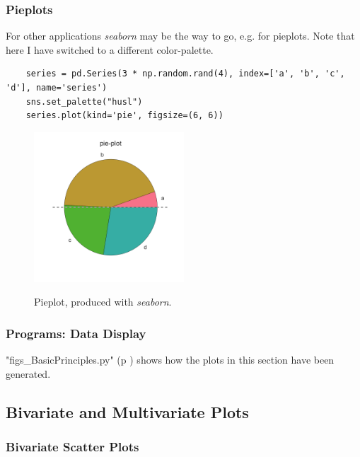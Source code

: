 \subsubsection{Pieplots}

For other applications \emph{seaborn} may be the way to go, e.g. for pieplots. Note that here I have switched to a different color-palette.

\begin{lstlisting}
    series = pd.Series(3 * np.random.rand(4), index=['a', 'b', 'c', 'd'], name='series')
    sns.set_palette("husl")
    series.plot(kind='pie', figsize=(6, 6))
\end{lstlisting}

\begin{figure}[H]
  \centering
  \includegraphics[width=0.5\textwidth]{../Images/pieplot.png}\\
  \caption{Pieplot, produced with \emph{seaborn}.}\label{fig:pieplot}
\end{figure}


\subsubsection{Programs: Data Display}
\PyImg "figs\_BasicPrinciples.py" (p \pageref{py:BasicPrinciples}) shows how the plots in this section have been generated.

\subsection{Bivariate and Multivariate Plots}

\subsubsection{Bivariate Scatter Plots}


